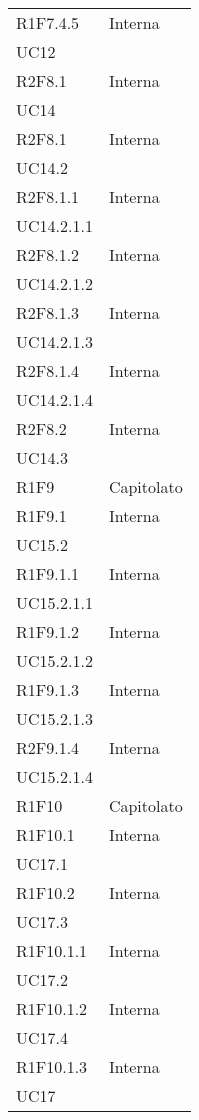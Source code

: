 \begin{longtable}{|C{6.5cm}|C{6.5cm}|}
	R1F7.4.5 & \centering Interna \\ UC12 \tabularnewline

	R2F8.1 & \centering Interna \\ UC14 \tabularnewline

	R2F8.1 & \centering Interna \\ UC14.2 \tabularnewline

	R2F8.1.1 & \centering Interna \\ UC14.2.1.1 \tabularnewline

	R2F8.1.2 & \centering Interna \\ UC14.2.1.2 \tabularnewline

	R2F8.1.3 & \centering Interna \\ UC14.2.1.3 \tabularnewline

	R2F8.1.4 & \centering Interna \\ UC14.2.1.4 \tabularnewline

	R2F8.2 & \centering Interna \\ UC14.3 \tabularnewline

	R1F9 &  Capitolato \\

	R1F9.1 & \centering Interna \\ UC15.2 \tabularnewline

	R1F9.1.1 & \centering Interna \\ UC15.2.1.1 \tabularnewline

	R1F9.1.2 & \centering Interna \\ UC15.2.1.2 \tabularnewline

	R1F9.1.3 & \centering Interna \\ UC15.2.1.3 \tabularnewline

	R2F9.1.4 & \centering Interna \\ UC15.2.1.4 \tabularnewline

	R1F10 & Capitolato \\

	R1F10.1 &  \centering Interna \\ UC17.1 \tabularnewline

	R1F10.2 & \centering Interna \\ UC17.3 \tabularnewline

	R1F10.1.1 &  \centering Interna \\ UC17.2 \tabularnewline

	R1F10.1.2 &  \centering Interna \\ UC17.4 \tabularnewline

	R1F10.1.3 &  \centering Interna \\ UC17 \tabularnewline


\end{longtable}

